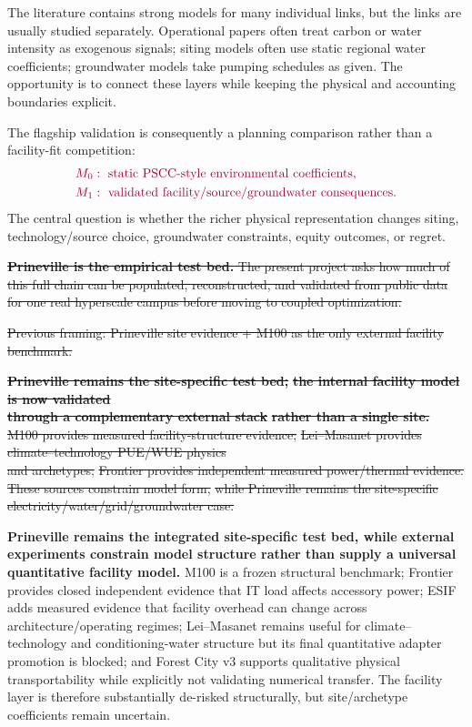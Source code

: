\documentclass[11pt]{article}
\newcommand{\oldtxt}[1]{\textcolor{blue!70!black}{\sout{#1}}}
\newcommand{\latesttxt}[1]{\textcolor{purple!85!black}{#1}}
\begin{document}
The literature contains strong models for many individual links, but the links are usually studied separately. Operational papers often treat carbon or water intensity as exogenous signals; siting models often use static regional water coefficients; groundwater models take pumping schedules as given. The opportunity is to connect these layers while keeping the physical and accounting boundaries explicit.

\latesttxt{The flagship validation is consequently a planning comparison rather than a facility-fit competition:}
\[
{\color{purple!85!black}
\begin{aligned}
M_0 &: \ \text{static PSCC-style environmental coefficients},\\
M_1 &: \ \text{validated facility/source/groundwater consequences}.
\end{aligned}
}
\]
\latesttxt{The central question is whether the richer physical representation changes siting, technology/source choice, groundwater constraints, equity outcomes, or regret.}

\oldtxt{\textbf{Prineville is the empirical test bed.} The present project asks how much of this full chain can be populated, reconstructed, and validated from public data for one real hyperscale campus before moving to coupled optimization.}

\oldtxt{Previous framing: Prineville site evidence + M100 as the only external facility benchmark.}

{\small
\oldtxt{\textbf{Prineville remains the site-specific test bed;}} \oldtxt{\textbf{the internal facility model is now validated}}\\
\oldtxt{\textbf{through a complementary external stack}} \oldtxt{\textbf{rather than a single site.}}\\
\oldtxt{M100 provides measured facility-structure evidence;} \oldtxt{Lei--Masanet provides climate--technology PUE/WUE physics}\\
\oldtxt{and archetypes;} \oldtxt{Frontier provides independent measured power/thermal evidence.}\\
\oldtxt{These sources constrain model form,} \oldtxt{while Prineville remains the site-specific}\\
\oldtxt{electricity/water/grid/groundwater case.}\par}

\latesttxt{\textbf{Prineville remains the integrated site-specific test bed, while external experiments constrain model structure rather than supply a universal quantitative facility model.} M100 is a frozen structural benchmark; Frontier provides closed independent evidence that IT load affects accessory power; ESIF adds measured evidence that facility overhead can change across architecture/operating regimes; Lei--Masanet remains useful for climate--technology and conditioning-water structure but its final quantitative adapter promotion is blocked; and Forest City v3 supports qualitative physical transportability while explicitly not validating numerical transfer. The facility layer is therefore substantially de-risked structurally, but site/archetype coefficients remain uncertain.}
\end{document}
